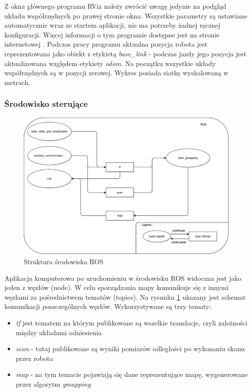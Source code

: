 Z okna głównego programu RViz należy zwrócić uwagę jedynie na podgląd układu współrzędnych po prawej stronie okna. Wszystkie parametry są ustawiane automatycznie wraz ze startem aplikacji, nie ma potrzeby żadnej ręcznej konfiguracji. Więcej informacji o tym programie dostępne jest na stronie internetowej \cite{rviz}.
Podczas pracy programu aktualna pozycja robota jest reprezentowana jako obiekt z etykietą \emph{base\_link} - podczas jazdy jego pozycja jest aktualizowana względem etykiety \emph{odom}. Na początku wszystkie układy współrzędnych są w pozycji zerowej. Wykres posiada siatkę wyskalowaną w metrach.

\subsubsection{Środowisko sterujące}
\label{sec:ros-env}
\begin{figure}[ht]
	\centering
		\includegraphics[width=1\linewidth]{rys/pc-application-infrastructure.pdf}
	\caption{Struktura środowiska ROS}
	\label{fig:pc-app-ros-infrastructure}
\end{figure}

Aplikacja komputerowa po uruchomieniu w środowisku ROS widoczna jest jako jeden z węzłów (node). W celu sporządzania mapy komunikuje się z innymi węzłami za pośrednictwem tematów (topics).
Na rysunku \ref{fig:pc-app-ros-infrastructure} ukazany jest schemat komunikacji poszczególnych węzłów.
Wykorzystywane są trzy tematy:
\begin{itemize}
    \item \emph{tf} jest tematem na którym publikowane są wszelkie translacje, czyli zależności między układami odniesienia
    \item \emph{scan} - tutaj publikowane są wyniki pomiarów odległości po wykonaniu skanu przez robota
    \item \emph{map} - na tym temacie pojawiają się dane reprezentujące mapę, wygenerowane przez algorytm \emph{gmapping}\cite{Grisetti2005}\cite{gmapping-website}\cite{gmapping-ros}
\end{itemize}

